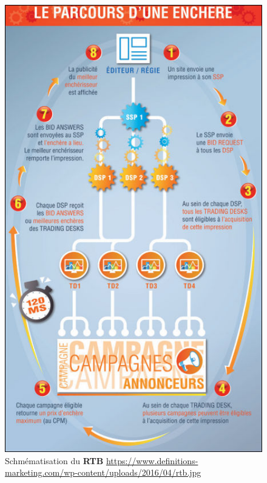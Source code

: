         \begin{figure}
            \label{fig:rtb}
            \centering
            \includegraphics[scale=0.3]{images/rtb.jpg}
            \caption{Schmématisation du \textbf{RTB} \url{https://www.definitions-marketing.com/wp-content/uploads/2016/04/rtb.jpg}}
        \end{figure}
